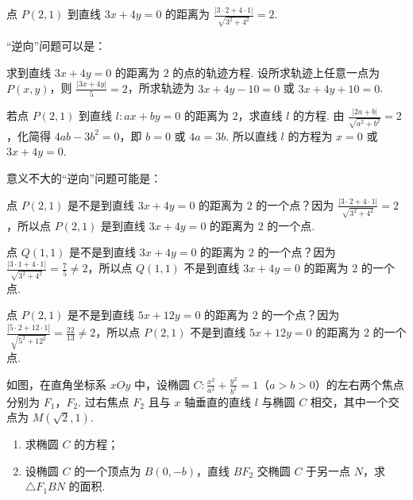 \begin{solution}
点 \(P(2,1)\) 到直线 \(3x+4y=0\) 的距离为 \(\frac{|3\cdot 2+4\cdot 1|}{\sqrt{3^2+4^2}}=2\).

“逆向”问题可以是：

求到直线 \(3x+4y=0\) 的距离为 \(2\) 的点的轨迹方程. 设所求轨迹上任意一点为 \(P(x,y)\)，则 \(\frac{|3x+4y|}{5}=2\)，所求轨迹为 \(3x+4y-10=0\) 或 \(3x+4y+10=0\).

若点 \(P(2,1)\) 到直线 \(l:ax+by=0\) 的距离为 \(2\)，求直线 \(l\) 的方程. 由 \(\frac{|2a+b|}{\sqrt{a^2+b^2}}=2\)，化简得 \(4ab-3b^2=0\)，即 \(b=0\) 或 \(4a=3b\). 所以直线 \(l\) 的方程为 \(x=0\) 或 \(3x+4y=0\).

意义不大的“逆向”问题可能是：

点 \(P(2,1)\) 是不是到直线 \(3x+4y=0\) 的距离为 \(2\) 的一个点？因为 \(\frac{|3\cdot2+4\cdot1|}{\sqrt{3^2+4^2}}=2\)，所以点 \(P(2,1)\) 是到直线 \(3x+4y=0\) 的距离为 \(2\) 的一个点.

点 \(Q(1,1)\) 是不是到直线 \(3x+4y=0\) 的距离为 \(2\) 的一个点？因为 \(\frac{|3\cdot1+4\cdot1|}{\sqrt{3^2+4^2}}=\frac{7}{5}\neq 2\)，所以点 \(Q(1,1)\) 不是到直线 \(3x+4y=0\) 的距离为 \(2\) 的一个点.

点 \(P(2,1)\) 是不是到直线 \(5x+12y=0\) 的距离为 \(2\) 的一个点？因为 \(\frac{|5\cdot2+12\cdot1|}{\sqrt{5^2+12^2}}=\frac{22}{13}\neq 2\)，所以点 \(P(2,1)\) 不是到直线 \(5x+12y=0\) 的距离为 \(2\) 的一个点.
\end{solution}

\begin{problem}
如图，在直角坐标系 \(xOy\) 中，设椭圆 \(C:\frac{x^2}{a^2}+\frac{y^2}{b^2}=1\)（\(a>b>0\)）的左右两个焦点分别为 \(F_1\)，\(F_2\). 过右焦点 \(F_2\) 且与 \(x\) 轴垂直的直线 \(l\) 与椭圆 \(C\) 相交，其中一个交点为 \(M(\sqrt{2},1)\).

\begin{enumerate}
\item 求椭圆 \(C\) 的方程；
\item 设椭圆 \(C\) 的一个顶点为 \(B(0,-b)\)，直线 \(BF_2\) 交椭圆 \(C\) 于另一点 \(N\)，求 \(\triangle F_1BN\) 的面积.
\end{enumerate}

\end{problem}

